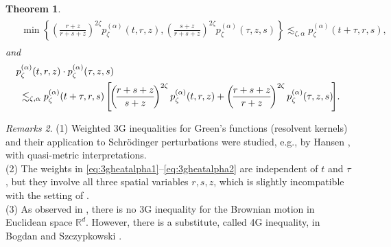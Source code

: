 \documentclass[12pt,reqno,a4paper]{amsart}
\newtheorem{theorem}{Theorem}[section]
\theoremstyle{definition}
\theoremstyle{remark}
\newtheorem{remarks}[theorem]{Remarks}
\numberwithin{equation}{section}
\newcommand{\1}{\mathbbm{1}}
\newcommand{\R}{\mathbb{R}}
\begin{document}
\begin{theorem}
\begin{align}
\begin{split}
      & \min\left\{ \! \left(\!\frac{r+z}{r+s+z}\!\right)^{2\zeta} p_\zeta^{(\alpha)}(t,r,z), \left(\!\frac{s+z}{r+s+z}\!\right)^{2\zeta} p_\zeta^{(\alpha)}(\tau,z,s) \! \right\}
        \!\lesssim_{\zeta,\alpha}\! p_\zeta^{(\alpha)}(t+\tau,r,s),
    \end{split}
  \end{align}
  and
  \begin{align}
    \label{eq:3gheatalpha2}
    & p_\zeta^{(\alpha)}(t,r,z)\cdot p_\zeta^{(\alpha)}(\tau,z,s) \\
    \notag
    & \ \lesssim_{\zeta,\alpha} p_\zeta^{(\alpha)}(t+\tau,r,s) \left[\! \left(\!\frac{r+s+z}{s+z}\!\right)^{2\zeta} p_\zeta^{(\alpha)}(t,r,z) + \left(\!\frac{r+s+z}{r+z}\!\right)^{2\zeta} p_\zeta^{(\alpha)}(\tau,z,s) \! \right]\!.
  \end{align}
\end{theorem}

\begin{remarks}
  (1) Weighted 3G inequalities for Green's functions (resolvent kernels) and their application to Schr\"odinger perturbations were studied, e.g., by Hansen \cite{Hansen2006}, with quasi-metric interpretations.
  \\
  (2) The weights in \eqref{eq:3gheatalpha1}--\eqref{eq:3gheatalpha2} are independent of $t$ and $\tau$, but they involve all three spatial variables $r,s,z$, which is slightly incompatible with the setting of \cite{Hansen2006}.
  \\
  (3) As observed in \cite[p.~182]{BogdanJakubowski2007}, there is no 3G inequality for the Brownian motion in Euclidean space $\R^d$. However, there is a substitute, called 4G inequality, in Bogdan and Szczypkowski \cite[Theorem~1.3]{BogdanSzczypkowski2014}.
\end{remarks}
  
\end{document}
